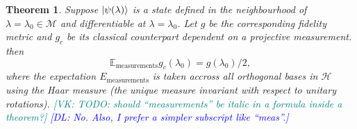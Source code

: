 \documentclass[american,aps,pra,reprint,floatfix,nofootinbib,superscriptaddress]{revtex4-2}
\newtheorem{theorem}{Theorem}
\newcommand{\VK}[1]{\textcolor{teal}{[VK: #1]}}
\newcommand{\DL}[1]{\textcolor{blue}{[DL: #1]}}
\begin{document}
\begin{theorem}
  \label{th:avggc}
  Suppose $\ket{\psi(\lambda)}$ is a state defined in the
  neighbourhood of $\lambda = \lambda_0 \in \mathcal{M}$ and differentiable at
  $\lambda=\lambda_0$. Let $g$ be the corresponding fidelity metric
  and $g_c$ be its classical counterpart dependent on a projective
  measurement. then
  \begin{equation}
    \label{eq:Emeas}
    \mathbb{E}_{\textrm{measurements}} g_c(\lambda_0) = g(\lambda_0) / 2,
  \end{equation}
where the expectation $E_{\textrm{measurements}}$ is taken accross
all orthogonal bases in $\mathcal{H}$ using the Haar measure (the unique measure
invariant with respect to unitary rotations).
\VK{TODO: should ``measurements'' be italic in a formula inside a theorem?} \DL{No. Also, I prefer a simpler subscript like ``meas''.}
\end{theorem}
\end{document}

